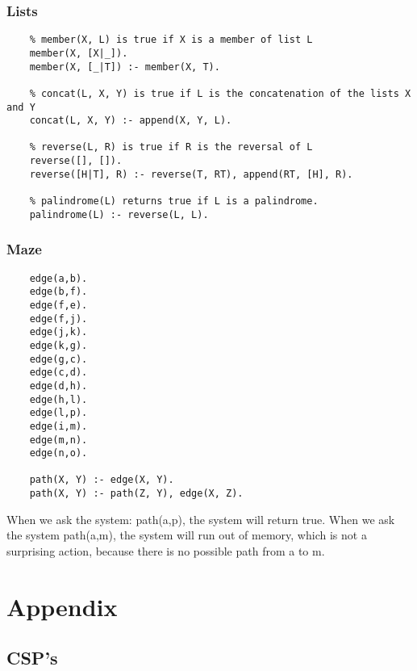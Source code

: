 \documentclass{article}
\begin{document}
	\subsubsection*{Lists}
	\begin{lstlisting}
	% member(X, L) is true if X is a member of list L
	member(X, [X|_]).
	member(X, [_|T]) :- member(X, T).
	
	% concat(L, X, Y) is true if L is the concatenation of the lists X and Y
	concat(L, X, Y) :- append(X, Y, L).
	
	% reverse(L, R) is true if R is the reversal of L
	reverse([], []).
	reverse([H|T], R) :- reverse(T, RT), append(RT, [H], R).
	
	% palindrome(L) returns true if L is a palindrome.
	palindrome(L) :- reverse(L, L).
	\end{lstlisting}
	\subsubsection*{Maze}
	\begin{lstlisting}	
	edge(a,b).
	edge(b,f).
	edge(f,e).
	edge(f,j).
	edge(j,k).
	edge(k,g).
	edge(g,c).
	edge(c,d).
	edge(d,h).
	edge(h,l).
	edge(l,p).
	edge(i,m).
	edge(m,n).
	edge(n,o).
	
	path(X, Y) :- edge(X, Y).
	path(X, Y) :- path(Z, Y), edge(X, Z).
	\end{lstlisting}
	When we ask the system: path(a,p), the system will return true. When we ask the system path(a,m), the system will run out of memory, which is not a surprising action, because there is no possible path from a to m.
	\section{Appendix}
	\subsection*{CSP's}
	
\end{document}

